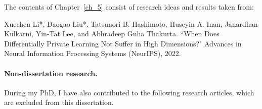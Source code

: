 \noindent The contents of Chapter~\ref{ch_5} consist of research ideas and results taken from:

\begin{mdframed}[leftline=true, topline=false, rightline=false, bottomline=false, linewidth=2pt]
Xuechen Li*, Daogao Liu*, Tatsunori B. Hashimoto, Huseyin A. Inan, Janardhan Kulkarni, Yin-Tat Lee, and Abhradeep Guha Thakurta. ``When Does Differentially Private Learning Not Suffer in High Dimensions?" Advances in Neural Information Processing Systems (NeurIPS), 2022.~\cite{li2022does}
\end{mdframed}


\newpage
\paragraph{Non-dissertation research.}
During my PhD, I have also contributed to the following research articles, which are excluded from this dissertation.


